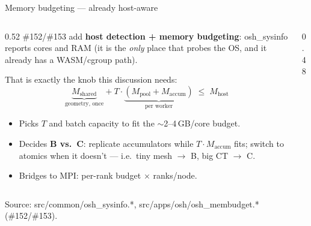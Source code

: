 \documentclass[aspectratio=169,10pt]{beamer}
\newcommand{\code}[1]{{\ttfamily\footnotesize #1}}
\begin{document}
\begin{frame}{Memory budgeting — already host-aware}
  \begin{columns}[T]
    \begin{column}{0.52\textwidth}
      \small
      \#152/\#153 add \textbf{host detection + memory budgeting}:
      \code{osh\_sysinfo} reports cores and RAM (it is the \emph{only} place that
      probes the OS, and it already has a WASM/cgroup path).
      \medskip

      That is exactly the knob this discussion needs:
      \[
        \underbrace{M_\text{shared}}_{\text{geometry, once}}
        + T\cdot\underbrace{(M_\text{pool}+M_\text{accum})}_{\text{per worker}}
        \;\le\; M_\text{host}
      \]
      \begin{itemize}\itemsep2pt
        \item Picks $T$ and batch capacity to fit the $\sim$2--4\,GB/core budget.
        \item Decides \textbf{B vs.\ C}: replicate accumulators while
              $T\cdot M_\text{accum}$ fits; switch to atomics when it doesn't —
              i.e.\ tiny mesh $\to$ B, big CT $\to$ C.
        \item Bridges to MPI: per-rank budget $\times$ ranks/node.
      \end{itemize}
    \end{column}
    \begin{column}{0.48\textwidth}
      \centering
    \end{column}
  \end{columns}
  \vspace{0.5mm}
  \footnotesize\color{oshGrey}
  Source: \code{src/common/osh\_sysinfo.*}, \code{src/apps/osh/osh\_membudget.*} (\#152/\#153).
\end{frame}
\end{document}

